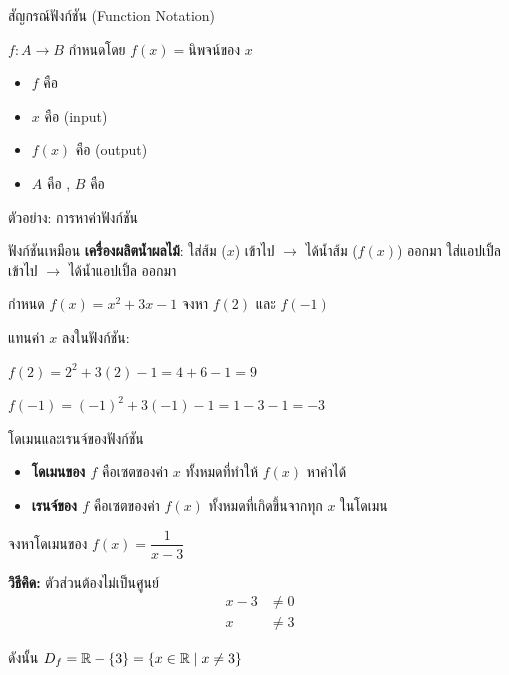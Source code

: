 \documentclass[11pt, aspectratio=169]{beamer}
\begin{document}
\begin{frame}{สัญกรณ์ฟังก์ชัน (Function Notation)}
  \begin{explanation}[สัญกรณ์]
    $f: A \to B$ กำหนดโดย $f(x) = \text{นิพจน์ของ } x$

    \medskip
    \begin{itemize}
      \item $f$ คือ 
      \item $x$ คือ  (input)
      \item $f(x)$ คือ  (output)
      \item $A$ คือ , $B$ คือ 
    \end{itemize}
  \end{explanation}
\end{frame}

\begin{frame}{ตัวอย่าง: การหาค่าฟังก์ชัน}
  \begin{intuition}[สังเกต]
    ฟังก์ชันเหมือน \textbf{เครื่องผลิตนํ้าผลไม้}: \newline
    ใส่ส้ม ($x$) เข้าไป $\rightarrow$ ได้นํ้าส้ม ($f(x)$) ออกมา\newline 
    ใส่แอปเปิ้ล เข้าไป $\rightarrow$ ได้นํ้าแอปเปิ้ล ออกมา
  \end{intuition}

  \begin{exambox}[โจทย์]
    กำหนด $f(x) = x^2 + 3x - 1$ จงหา $f(2)$ และ $f(-1)$
  \end{exambox}

  \begin{solbox}[วิธีทำ]
    แทนค่า $x$ ลงในฟังก์ชัน:

    $f(2) = 2^2 + 3(2) - 1 = 4 + 6 - 1 = 9$

    $f(-1) = (-1)^2 + 3(-1) - 1 = 1 - 3 - 1 = -3$
  \end{solbox}
\end{frame}

\begin{frame}{โดเมนและเรนจ์ของฟังก์ชัน}
  \begin{itemize}
    \item \textbf{โดเมนของ $f$} คือเซตของค่า $x$ ทั้งหมดที่ทำให้ $f(x)$ หาค่าได้
    \item \textbf{เรนจ์ของ $f$} คือเซตของค่า $f(x)$ ทั้งหมดที่เกิดขึ้นจากทุก $x$ ในโดเมน
  \end{itemize}

  \begin{exambox}[โจทย์]
    จงหาโดเมนของ $f(x) = \dfrac{1}{x - 3}$
  \end{exambox}

  \begin{solbox}[วิธีทำ]
    \textbf{วิธีคิด:} ตัวส่วนต้องไม่เป็นศูนย์
    \begin{align*}
      x - 3 &\neq 0 \\
      x &\neq 3
    \end{align*}

    ดังนั้น $D_f = \mathbb{R} - \{3\} = \{x \in \mathbb{R} \mid x \neq 3\}$
  \end{solbox}
\end{frame}
\end{document}
